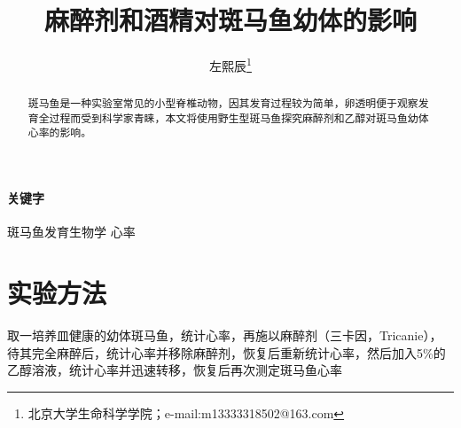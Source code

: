 \documentclass[UTF-8]{ctexart}
\author{左熙辰\thanks{北京大学生命科学学院；e-mail:m13333318502@163.com}}
\date{}
\title{麻醉剂和酒精对斑马鱼幼体的影响}
\begin{document}
    \maketitle
    \begin{abstract}
        斑马鱼是一种实验室常见的小型脊椎动物，因其发育过程较为简单，卵透明便于观察发育全过程而受到科学家青睐，本文将使用野生型斑马鱼探究麻醉剂和乙醇对斑马鱼幼体心率的影响。
    \end{abstract}
    \paragraph*{关键字}斑马鱼\text{ }发育生物学\text{ } 心率 
    \section{实验方法}
    取一培养皿健康的幼体斑马鱼，统计心率，再施以麻醉剂（三卡因，Tricanie），待其完全麻醉后，统计心率并移除麻醉剂，恢复后重新统计心率，然后加入5\%的乙醇溶液，统计心率并迅速转移，恢复后再次测定斑马鱼心率
\end{document}
